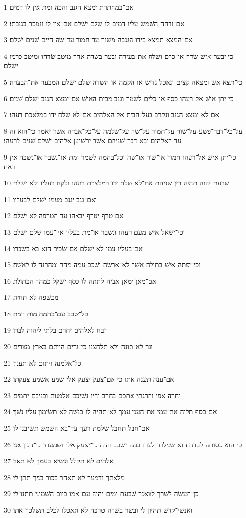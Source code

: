 \par 1 אם־במחתרת ימצא הגנב והכה ומת אין לו דמים׃
\par 2 אם־זרחה השׁמשׁ עליו דמים לו שׁלם ישׁלם אם־אין לו ונמכר בגנבתו׃
\par 3 אם־המצא תמצא בידו הגנבה משׁור עד־חמור עד־שׂה חיים שׁנים ישׁלם׃
\par 4 כי יבער־אישׁ שׂדה או־כרם ושׁלח את־בעירה ובער בשׂדה אחר מיטב שׂדהו ומיטב כרמו ישׁלם׃
\par 5 כי־תצא אשׁ ומצאה קצים ונאכל גדישׁ או הקמה או השׂדה שׁלם ישׁלם המבער את־הבערה׃
\par 6 כי־יתן אישׁ אל־רעהו כסף או־כלים לשׁמר וגנב מבית האישׁ אם־ימצא הגנב ישׁלם שׁנים׃
\par 7 אם־לא ימצא הגנב ונקרב בעל־הבית אל־האלהים אם־לא שׁלח ידו במלאכת רעהו׃
\par 8 על־כל־דבר־פשׁע על־שׁור על־חמור על־שׂה על־שׂלמה על־כל־אבדה אשׁר יאמר כי־הוא זה עד האלהים יבא דבר־שׁניהם אשׁר ירשׁיען אלהים ישׁלם שׁנים לרעהו׃
\par 9 כי־יתן אישׁ אל־רעהו חמור או־שׁור או־שׂה וכל־בהמה לשׁמר ומת או־נשׁבר או־נשׁבה אין ראה׃
\par 10 שׁבעת יהוה תהיה בין שׁניהם אם־לא שׁלח ידו במלאכת רעהו ולקח בעליו ולא ישׁלם׃
\par 11 ואם־גנב יגנב מעמו ישׁלם לבעליו׃
\par 12 אם־טרף יטרף יבאהו עד הטרפה לא ישׁלם׃
\par 13 וכי־ישׁאל אישׁ מעם רעהו ונשׁבר או־מת בעליו אין־עמו שׁלם ישׁלם׃
\par 14 אם־בעליו עמו לא ישׁלם אם־שׂכיר הוא בא בשׂכרו׃
\par 15 וכי־יפתה אישׁ בתולה אשׁר לא־ארשׂה ושׁכב עמה מהר ימהרנה לו לאשׁה׃
\par 16 אם־מאן ימאן אביה לתתה לו כסף ישׁקל כמהר הבתולת׃
\par 17 מכשׁפה לא תחיה׃
\par 18 כל־שׁכב עם־בהמה מות יומת׃
\par 19 זבח לאלהים יחרם בלתי ליהוה לבדו׃
\par 20 וגר לא־תונה ולא תלחצנו כי־גרים הייתם בארץ מצרים׃
\par 21 כל־אלמנה ויתום לא תענון׃
\par 22 אם־ענה תענה אתו כי אם־צעק יצעק אלי שׁמע אשׁמע צעקתו׃
\par 23 וחרה אפי והרגתי אתכם בחרב והיו נשׁיכם אלמנות ובניכם יתמים׃
\par 24 אם־כסף תלוה את־עמי את־העני עמך לא־תהיה לו כנשׁה לא־תשׂימון עליו נשׁך׃
\par 25 אם־חבל תחבל שׂלמת רעך עד־בא השׁמשׁ תשׁיבנו לו׃
\par 26 כי הוא כסותה לבדה הוא שׂמלתו לערו במה ישׁכב והיה כי־יצעק אלי ושׁמעתי כי־חנון אני׃
\par 27 אלהים לא תקלל ונשׂיא בעמך לא תאר׃
\par 28 מלאתך ודמעך לא תאחר בכור בניך תתן־לי׃
\par 29 כן־תעשׂה לשׁרך לצאנך שׁבעת ימים יהיה עם־אמו ביום השׁמיני תתנו־לי׃
\par 30 ואנשׁי־קדשׁ תהיון לי ובשׂר בשׂדה טרפה לא תאכלו לכלב תשׁלכון אתו׃


